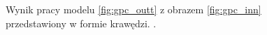 \begin{figure}[ht]
  \centering
  \caption{Wynik pracy modelu \ref{fig:gpc_outt} z obrazem \ref{fig:gpc_inn} przedstawiony w formie krawędzi. \cite{Guy1993}.}
  \label{fig:gpc_m_out}
\end{figure}


